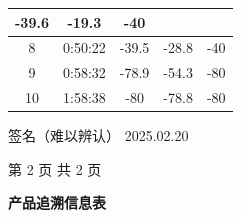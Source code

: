 \documentclass[UTF8,10pt,a4paper,fontset=fandol]{ctexart}
\newcommand{\fieldvalue}[1]{#1}
\newcommand{\handwritten}[1]{#1}
\begin{document}
\begin{center}
\begin{tabular}{|c|c|c|c|c|}
\fieldvalue{-39.6} &
\fieldvalue{-19.3} &
\fieldvalue{-40}\\
\hline
\fieldvalue{8} &
\fieldvalue{0:50:22} &
\fieldvalue{-39.5} &
\fieldvalue{-28.8} &
\fieldvalue{-40}\\
\hline
\fieldvalue{9} &
\fieldvalue{0:58:32} &
\fieldvalue{-78.9} &
\fieldvalue{-54.3} &
\fieldvalue{-80}\\
\hline
\fieldvalue{10} &
\fieldvalue{1:58:38} &
\fieldvalue{-80} &
\fieldvalue{-78.8} &
\fieldvalue{-80}\\
\hline
\end{tabular}
\end{center}

\bigskip

\begin{flushright}
\handwritten{签名（难以辨认）}\quad
\handwritten{2025.02.20}
\end{flushright}

\begin{center}
第 2 页 共 2 页
\end{center}

\newpage

\begin{center}
\textbf{产品追溯信息表}
\end{center}
\end{document}
